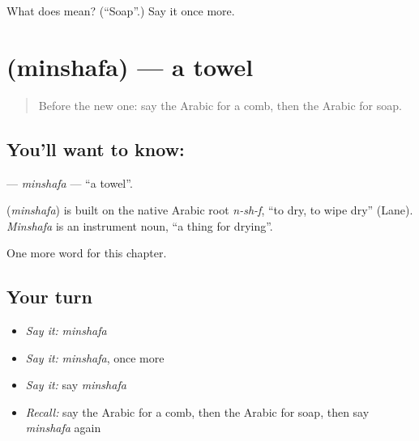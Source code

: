 \begin{tcolorbox}[breakable,colback=teal!4,colframe=teal!35!black,title={Before you move on}]
What does  mean? (\textquotedblleft{}Soap\textquotedblright{}.) Say it once more.
\end{tcolorbox}
\section[\texorpdfstring{\ar{منشفة} (minshafa)}{منشفة (minshafa)}]{ (minshafa) — a towel}

\label{lesson:AR-C122-minshafa}



\begin{quote}
Before the new one: say the Arabic for a comb, then the Arabic for soap.
\end{quote}

\subsection*{You'll want to know: }
\textbf{} — \emph{minshafa} — \textquotedblleft{}a towel\textquotedblright{}.

\begin{cousinweb}
\textbf{} (\emph{minshafa}) is built on the native Arabic root \emph{n-sh-f}, \textquotedblleft{}to dry, to wipe dry\textquotedblright{} (Lane). \emph{Minshafa} is an instrument noun, \textquotedblleft{}a thing for drying\textquotedblright{}.
\end{cousinweb}

\begin{grammarlens}[title={What you've built}]
One more word for this chapter.
\end{grammarlens}

\subsection*{Your turn}
\begin{itemize}
\raggedright
  \item \emph{Say it:} \emph{minshafa}
  \item \emph{Say it:} \emph{minshafa}, once more
  \item \emph{Say it:} say \emph{minshafa}
  \item \emph{Recall:} say the Arabic for a comb, then the Arabic for soap, then say \emph{minshafa} again
\end{itemize}

